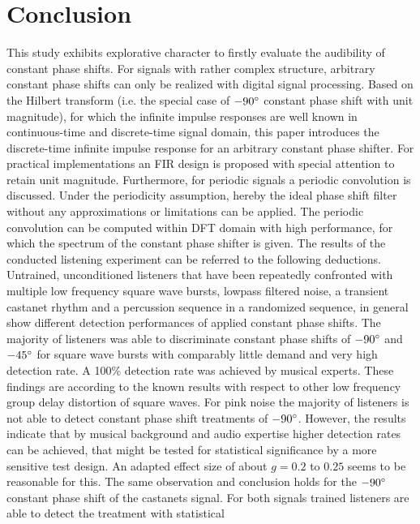 \section{Conclusion}
\label{sec:conclusion}
This study exhibits explorative character to firstly evaluate
the audibility of constant phase shifts.
%
For signals with rather complex structure, arbitrary constant phase shifts can only
be realized with digital signal processing.
%
Based on the Hilbert transform (i.e. the special case of $-90\degree$ constant
phase shift with unit magnitude), for which the infinite impulse responses
are well known in continuous-time and discrete-time signal domain, this paper
introduces the discrete-time infinite impulse response for an arbitrary constant
phase shifter.
%
For practical implementations an FIR design is proposed with special attention
to retain unit magnitude.
%
Furthermore, for periodic signals a periodic convolution is discussed.
%
Under the periodicity assumption, hereby the ideal phase shift filter without any
approximations or limitations can be applied.
%
The periodic convolution can be computed within DFT domain with high performance,
for which the spectrum of the constant phase shifter is given.
%
\NewL The results of the conducted listening experiment can be referred to the following
deductions.
%
Untrained, unconditioned listeners that have been repeatedly confronted with
multiple low frequency square wave bursts, lowpass filtered noise,
a transient castanet rhythm and a percussion sequence in a randomized sequence,
in general show different detection performances of applied constant phase shifts.
%
\NewL The majority of listeners was able to discriminate constant phase shifts
of $-90\degree$ and $-45\degree$ for square wave bursts with comparably little
demand and very high detection rate.
%
A 100\% detection rate was achieved by musical experts.
%
These findings are according to the known results with respect to other
low frequency group delay distortion of square waves.
%
\NewL For pink noise the majority of listeners is not able to detect constant
phase shift treatments of $-90\degree$.
%
However, the results indicate that by musical background and audio expertise
higher detection rates can be achieved, that might be tested for statistical
significance by a more sensitive test design.
%
An adapted effect size of about $g=0.2$ to $0.25$ seems to be reasonable for this.
%
The same observation and conclusion holds for the $-90\degree$ constant phase shift
of the castanets signal.
%
For both signals trained listeners are able to detect the treatment with statistical
